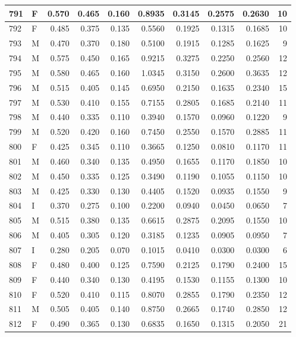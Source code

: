 \documentclass[9pt,twocolumn,twoside,]{pnas-new}
\begin{document}
\begin{tabular}{l|l|r|r|r|r|r|r|r|r}
\hline
791 & F & 0.570 & 0.465 & 0.160 & 0.8935 & 0.3145 & 0.2575 & 0.2630 & 10\\
\hline
792 & F & 0.485 & 0.375 & 0.135 & 0.5560 & 0.1925 & 0.1315 & 0.1685 & 10\\
\hline
793 & M & 0.470 & 0.370 & 0.180 & 0.5100 & 0.1915 & 0.1285 & 0.1625 & 9\\
\hline
794 & M & 0.575 & 0.450 & 0.165 & 0.9215 & 0.3275 & 0.2250 & 0.2560 & 12\\
\hline
795 & M & 0.580 & 0.465 & 0.160 & 1.0345 & 0.3150 & 0.2600 & 0.3635 & 12\\
\hline
796 & M & 0.515 & 0.405 & 0.145 & 0.6950 & 0.2150 & 0.1635 & 0.2340 & 15\\
\hline
797 & M & 0.530 & 0.410 & 0.155 & 0.7155 & 0.2805 & 0.1685 & 0.2140 & 11\\
\hline
798 & M & 0.440 & 0.335 & 0.110 & 0.3940 & 0.1570 & 0.0960 & 0.1220 & 9\\
\hline
799 & M & 0.520 & 0.420 & 0.160 & 0.7450 & 0.2550 & 0.1570 & 0.2885 & 11\\
\hline
800 & F & 0.425 & 0.345 & 0.110 & 0.3665 & 0.1250 & 0.0810 & 0.1170 & 11\\
\hline
801 & M & 0.460 & 0.340 & 0.135 & 0.4950 & 0.1655 & 0.1170 & 0.1850 & 10\\
\hline
802 & M & 0.450 & 0.335 & 0.125 & 0.3490 & 0.1190 & 0.1055 & 0.1150 & 10\\
\hline
803 & M & 0.425 & 0.330 & 0.130 & 0.4405 & 0.1520 & 0.0935 & 0.1550 & 9\\
\hline
804 & I & 0.370 & 0.275 & 0.100 & 0.2200 & 0.0940 & 0.0450 & 0.0650 & 7\\
\hline
805 & M & 0.515 & 0.380 & 0.135 & 0.6615 & 0.2875 & 0.2095 & 0.1550 & 10\\
\hline
806 & M & 0.405 & 0.305 & 0.120 & 0.3185 & 0.1235 & 0.0905 & 0.0950 & 7\\
\hline
807 & I & 0.280 & 0.205 & 0.070 & 0.1015 & 0.0410 & 0.0300 & 0.0300 & 6\\
\hline
808 & F & 0.480 & 0.400 & 0.125 & 0.7590 & 0.2125 & 0.1790 & 0.2400 & 15\\
\hline
809 & F & 0.440 & 0.340 & 0.130 & 0.4195 & 0.1530 & 0.1155 & 0.1300 & 10\\
\hline
810 & F & 0.520 & 0.410 & 0.115 & 0.8070 & 0.2855 & 0.1790 & 0.2350 & 12\\
\hline
811 & M & 0.505 & 0.405 & 0.140 & 0.8750 & 0.2665 & 0.1740 & 0.2850 & 12\\
\hline
812 & F & 0.490 & 0.365 & 0.130 & 0.6835 & 0.1650 & 0.1315 & 0.2050 & 21\\

\end{tabular}
\end{document}
